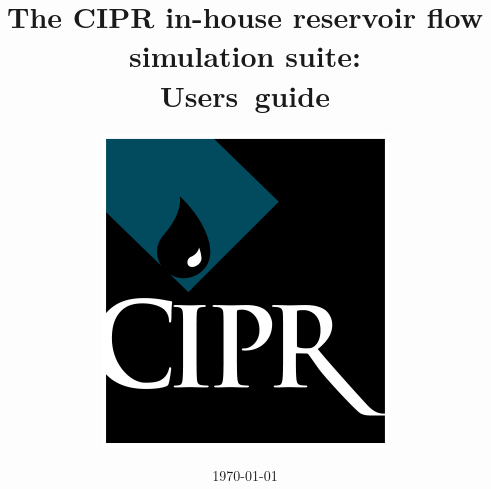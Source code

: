 \documentclass[a4paper,twoside,openright]{report}
\begin{document}
\dominitoc

\title{The CIPR in-house reservoir flow simulation suite:\\
Users~guide}
\author{\includegraphics[scale=2]{../figures/cipr-logo}}
\date{\today}

\maketitle

\tableofcontents













%





\end{document}
